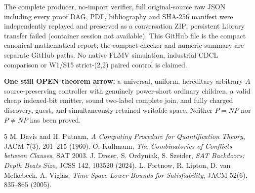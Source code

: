 \documentclass[11pt]{article}
\begin{document}
The complete producer, no-import verifier, full original-source raw JSON including every proof DAG, PDF, bibliography and SHA-256 manifest were independently replayed and preserved as a conversation ZIP; persistent Library transfer failed (container session not available). This GitHub file is the compact canonical mathematical report; the compact checker and numeric summary are separate GitHub paths. No native FLMV simulation, industrial CDCL comparison or W1/S15 strict-(2,2) paired control is claimed.

\noindent\textbf{One still OPEN theorem arrow:} a universal, uniform, hereditary arbitrary-$A$ source-preserving controller with genuinely power-short ordinary children, a valid cheap indexed-bit emitter, sound two-label complete join, and fully charged discovery, guest, and simultaneously retained writable space. Neither $P=NP$ nor $P\ne NP$ has been proved.
\begin{thebibliography}{5}
 M. Davis and H. Putnam, \emph{A Computing Procedure for Quantification Theory}, JACM 7(3), 201--215 (1960).
 O. Kullmann, \emph{The Combinatorics of Conflicts between Clauses}, SAT 2003.
 J. Dreier, S. Ordyniak, S. Szeider, \emph{SAT Backdoors: Depth Beats Size}, JCSS 142, 103520 (2024).
 L. Fortnow, R. Lipton, D. van Melkebeek, A. Viglas, \emph{Time-Space Lower Bounds for Satisfiability}, JACM 52(6), 835--865 (2005).
\end{thebibliography}
\end{document}
